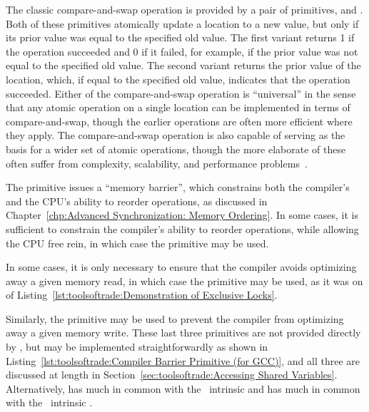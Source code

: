 The classic compare-and-swap operation is provided by a pair of
primitives,  and
.
Both of these primitives atomically update a location to a new value,
but only if its prior value was equal to the specified old value.
The first variant returns 1 if the operation succeeded and 0 if it
failed, for example, if the prior value was not equal to the specified
old value.
The second variant returns the prior value of the location, which, if
equal to the specified old value, indicates that the operation succeeded.
Either of the compare-and-swap operation is ``universal'' in the sense
that any atomic operation on a single location can be implemented in
terms of compare-and-swap, though the earlier operations are often
more efficient where they apply.
The compare-and-swap operation is also capable of serving as the basis
for a wider set of atomic operations, though the more elaborate of
these often suffer from complexity, scalability, and performance
problems~\cite{MauriceHerlihy90a}.

\QuickQuizEnd

The  primitive issues a ``memory barrier'',
which constrains both the compiler's and the CPU's ability to reorder
operations, as discussed in
Chapter~\ref{chp:Advanced Synchronization: Memory Ordering}.
In some cases, it is sufficient to constrain the compiler's ability
to reorder operations, while allowing the CPU free rein, in which
case the  primitive may be used.
\begin{fcvref}
In some cases, it is only necessary to ensure that the compiler
avoids optimizing away a given memory read, in which case the
 primitive may be used, as it was on  of
Listing~\ref{lst:toolsoftrade:Demonstration of Exclusive Locks}.
\end{fcvref}
Similarly, the  primitive may be used to prevent the
compiler from optimizing away a given memory write.
These last three primitives are not provided directly by \GCC,
but may be implemented straightforwardly as shown in
Listing~\ref{lst:toolsoftrade:Compiler Barrier Primitive (for GCC)},
and all three are discussed at length in
Section~\ref{sec:toolsoftrade:Accessing Shared Variables}.
Alternatively,  has much in common with
the \GCC\  intrinsic
and  has much in common with the \GCC\ 
intrinsic .

